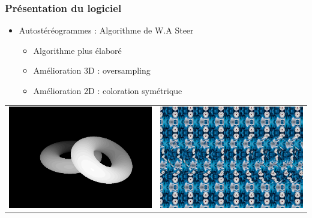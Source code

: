 \documentclass{beamer}
\begin{document}
%
\begin{frame}
\frametitle{Présentation du logiciel}
\begin{itemize}[label=$\bullet$]
	\item Autostéréogrammes : Algorithme de W.A Steer \cite{wasteer}
	\begin{itemize}[label=$\circ$]
	\item Algorithme plus élaboré
	\item Amélioration 3D : oversampling
	\item Amélioration 2D : coloration symétrique
	\end{itemize}
\end{itemize}
\begin{tabular}{l|r}
\includegraphics[scale=0.22]{donutdepth.png}
&
\includegraphics[scale=0.22]{donut2.png}
\end{tabular}

\end{frame}
\end{document}
